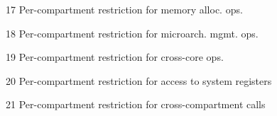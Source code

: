 \begin{threeparttable}
\begin{multicols}{2}
\begin{tablenotes}
		\item[17] Per-compartment restriction for memory alloc. ops.
		\item[18] Per-compartment restriction for microarch. mgmt. ops.
		\item[19] Per-compartment restriction for cross-core ops.
		\item[20] Per-compartment restriction for access to system registers
		\item[21] Per-compartment restriction for cross-compartment calls
	\end{tablenotes}
	\end{multicols}
\end{threeparttable}
